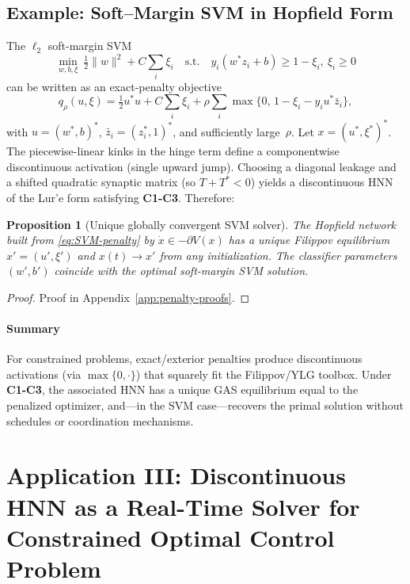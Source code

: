 \documentclass[journal]{IEEEtran}
\theoremstyle{myplain}
\newtheorem{proposition}{Proposition}
\begin{document}
\subsection{Example: Soft–Margin SVM in Hopfield Form}\label{sec:SVM-HNN}
The \(\ell_2\) soft-margin SVM
\begin{equation}\label{eq:SVM-primal}
  \min_{w,b,\xi}\ \tfrac12\|w\|^2 + C\sum_i \xi_i\quad \text{s.t.}\quad 
  y_i(w^* z_i + b) \ge 1-\xi_i,\ \xi_i\ge 0
\end{equation}
can be written as an exact-penalty objective
\begin{equation}\label{eq:SVM-penalty}
  q_\rho(u,\xi)=\tfrac12 u^* u + C\sum_i \xi_i + \rho\sum_i \max\{0,\,1-\xi_i-y_i u^*\bar z_i\},
\end{equation}
with \(u=(w^*,b)^*\), \(\bar z_i=(z_i^*,1)^*\), and sufficiently large~\(\rho\).
Let \(x=(u^*,\xi^*)^*\). The piecewise-linear kinks in the hinge term define a componentwise discontinuous activation (single upward jump). Choosing a diagonal leakage and a shifted quadratic synaptic matrix (so \(T+T^*<0\)) yields a discontinuous HNN of the Lur’e form satisfying \textbf{C1-C3}. Therefore:
\begin{proposition}[Unique globally convergent SVM solver]\label{prop:SVM}
The Hopfield network built from \eqref{eq:SVM-penalty} by \(\dot x\in -\partial V(x)\) has a unique Filippov equilibrium \(x'=(u',\xi')\) and \(x(t)\to x'\) from any initialization. 
The classifier parameters \((w',b')\) coincide with the optimal soft-margin SVM solution. 
\end{proposition}
\begin{proof}
  Proof in Appendix~\ref{app:penalty-proofs}.
\end{proof}

\paragraph*{Summary}
For constrained problems, exact/exterior penalties produce discontinuous activations (via \(\max\{0,\cdot\}\)) that squarely fit the Filippov/YLG toolbox. Under \textbf{C1-C3}, the associated HNN has a unique GAS equilibrium equal to the penalized optimizer, and—in the SVM case—recovers the primal solution without schedules or coordination mechanisms.


\section{Application III: Discontinuous HNN as a Real-Time Solver for Constrained Optimal Control Problem}
\label{sec:application_control}
\end{document}
